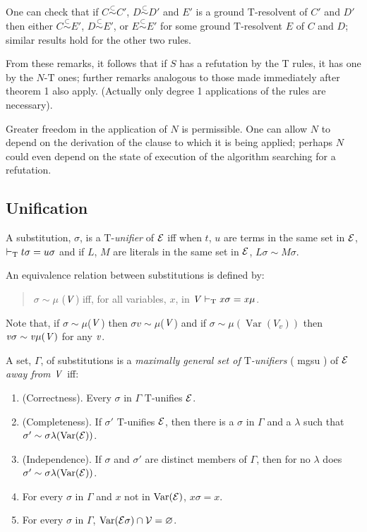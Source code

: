 \documentclass[letterpaper]{report}
\newcommand{\mgsu}{
	{\sc mgsu}%
}
\begin{document}
One can check that if $C\stackrel{{\subset}}{{\sim}}C'$,
$D\stackrel{{\subset}}{{\sim}}D'$ and $E'$ is a ground
$\mathrm{T}$-resolvent of $C'$ and $D'$ then
either $C\stackrel{{\subset}}{{\sim}}E'$,
$D\stackrel{{\subset}}{{\sim}}E'$, or
$E\stackrel{{\subset}}{{\sim}}E'$ for some ground
$\mathrm{T}$-resolvent $E$ of $C$ and $D$; similar results hold
for the other two rules.

From these remarks, it follows that if $S$ has a refutation by the T
rules, it has one by the $N$-$\mathrm{T}$ ones; further remarks
analogous to those made immediately after theorem 1 also apply.
(Actually only degree 1 applications of the rules are necessary).

Greater freedom in the application of $N$ is permissible. One can
allow $N$ to depend on the derivation of the clause to which it is
being applied; perhaps $N$ could even depend on the state of execution
of the algorithm searching for a refutation.

\subsection*{Unification}\label{unification}

A substitution, $\sigma$, is a $\mathrm{T}$-\emph{unifier} of
$\cal E$ iff when $t$, $u$ are terms in the same set in
$\cal E$, $\vdash_{\rm T}t\sigma=u\sigma$ and if $L$, $M$ are
literals in the same set in $\cal E$, $L\sigma\sim M\sigma$.

An equivalence relation between substitutions is defined by:
\begin{quote}
$\sigma\sim\mu$ ($\it V$) iff, for all variables, $x$, in
$\it V\vdash_{\rm T}x\sigma=x\mu$.
\end{quote}
Note that, if $\sigma\sim\mu$($\it V$) then
$\sigma v\sim\mu$($\it V$) and if $\sigma\sim\mu(\operatorname{Var}(V_v))$ then
$\it v\sigma\sim v\mu(V)$ for any $\it v$.

A set, $\Gamma$, of substitutions is a \emph{maximally general set of
	$\mathrm{T}$-unifiers} (\mgsu) of $\cal E$ \emph{away from $\it V$}
iff:

\begin{enumerate}
	\def\labelenumi{(\arabic{enumi})}
	\item
	(Correctness). Every $\sigma$ in $\Gamma$ $\mathrm{T}$-unifies
	$\cal E$.
	\item
	(Completeness). If $\sigma'$ $\mathrm{T}$-unifies
	$\cal E$, then there is a $\sigma$ in $\Gamma$ and a $\lambda$
	such that
	$\sigma'\sim\sigma\lambda(\operatorname{Var}(\cal E))$.
	\item
	(Independence). If $\sigma$ and $\sigma'$ are distinct
	members of $\Gamma$, then for no $\lambda$ does
	$\sigma'\sim\sigma\lambda(\operatorname{Var}(\cal E))$.
	\item
	For every $\sigma$ in $\Gamma$ and $x$ not in
	$\operatorname{Var}(\cal E)$, $x\sigma=x$.
	\item
	For every $\sigma$ in $\Gamma$,
	$\operatorname{Var}(\cal E \sigma)\cap V = \varnothing$.
\end{enumerate}
\end{document}
